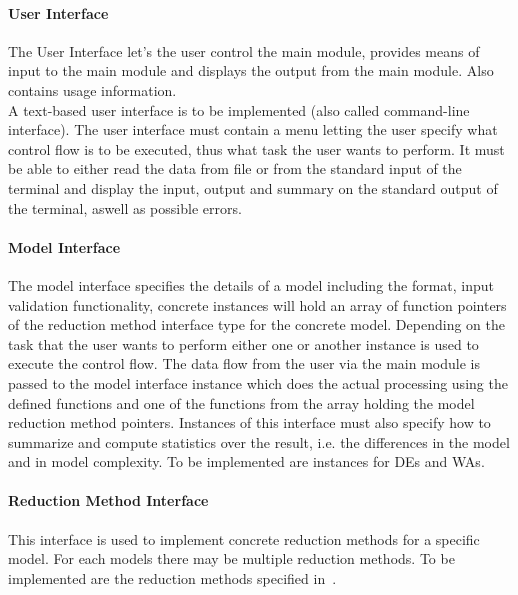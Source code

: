 			\paragraph{User Interface}
				The User Interface let's the user control the main module, provides means of input to the main module and displays the output from the main module. Also contains usage information. \\
				A text-based user interface is to be implemented (also called command-line interface). The user interface must contain a menu letting the user specify what control flow is to be executed, thus what task the user wants to perform. It must be able to either read the data from file or from the standard input of the terminal and display the input, output and summary on the standard output of the terminal, aswell as possible errors.
				
			
			\paragraph{Model Interface}
                The model interface specifies the details of a model including the format, input validation functionality, concrete instances will hold an array of function pointers of the reduction method interface type for the concrete model. Depending on the task that the user wants to perform either one or another instance is used to execute the control flow. The data flow from the user via the main module is passed to the model interface instance which does the actual processing using the defined functions and one of the functions from the array holding the model reduction method pointers. Instances of this interface must also specify how to summarize and compute statistics over the result, i.e. the differences in the model and in model complexity. To be implemented are instances for DEs and WAs.
			
			\paragraph{Reduction Method Interface}
                This interface is used to implement concrete reduction methods for a specific model. For each models there may be multiple reduction methods. To be implemented are the reduction methods specified in~\autocite{Cardelli2017MaximalAO, Kiefer2013OnTC}. 
			
